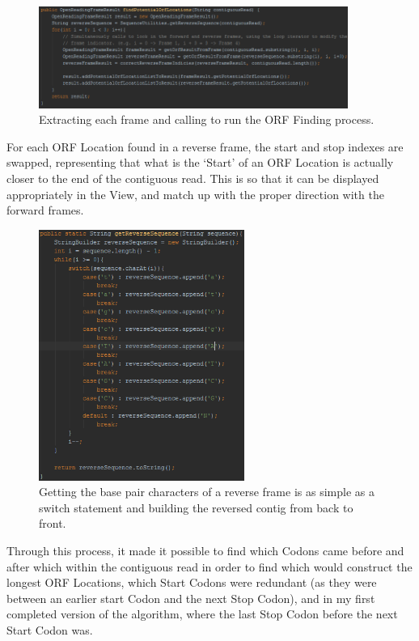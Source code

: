 \begin{figure}[H]
\centering
\includegraphics[width=0.9\textwidth]{images/orffind1}
\caption{Extracting each frame and calling to run the ORF Finding process.}
\end{figure}

For each ORF Location found in a reverse frame, the start and stop indexes are swapped, representing that what is the `Start' of an ORF Location is actually closer to the end of the contiguous read. This is so that it can be displayed appropriately in the View, and match up with the proper direction with the forward frames.

\begin{figure}[H]
\centering
\includegraphics[width=0.6\textwidth]{images/orffind4}
\caption{Getting the base pair characters of a reverse frame is as simple as a switch statement and building the reversed contig from back to front.}
\end{figure}

Through this process, it made it possible to find which Codons came before and after which within the contiguous read in order to find which would construct the longest ORF Locations, which Start Codons were redundant (as they were between an earlier start Codon and the next Stop Codon), and in my first completed version of the algorithm, where the last Stop Codon before the next Start Codon was.

